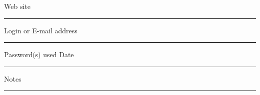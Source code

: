 \clearpage

\noindent Web site \
\vspace{-.1in} \\ \rule{\textwidth}{.2pt}
\vspace{0.5in}

\noindent Login or E-mail address \
\vspace{-.1in} \\ \rule{\textwidth}{.2pt}
\vspace{0.5in}

\noindent Password(s) used
\hspace{2in}
Date \
\vspace{-.1in} \\ \rule{\textwidth}{.2pt}
\vspace{2.5in}

\noindent Notes \
\vspace{-.1in} \\ \rule{\textwidth}{.2pt}
